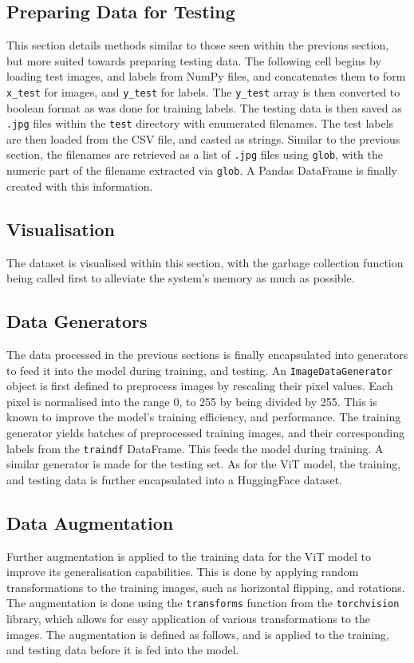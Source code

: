 \documentclass[../main]{subfiles}
\begin{document}
\subsection{Preparing Data for Testing}
This section details methods similar to those seen within the previous section,
but more suited towards preparing testing data. The following cell begins by
loading test images, and labels from NumPy files, and concatenates them to form
\texttt{x\_test} for images, and \texttt{y\_test} for labels. The
\texttt{y\_test} array is then converted to boolean format as was done for
training labels. The testing data is then saved as \texttt{.jpg} files within
the \texttt{test} directory with enumerated filenames. The test labels are then
loaded from the CSV file, and casted as strings. Similar to the previous
section, the filenames are retrieved as a list of \texttt{.jpg} files using
\texttt{glob}, with the numeric part of the filename extracted via
\texttt{glob}. A Pandas DataFrame is finally created with this information.

\subsection{Visualisation}
The dataset is visualised within this section, with the garbage
collection function being called first to alleviate the system's memory
as much as possible.
   
\subsection{Data Generators}
The data processed in the previous sections is finally encapsulated into
generators to feed it into the model during training, and testing. An
\texttt{ImageDataGenerator} object is first defined to preprocess images by
rescaling their pixel values. Each pixel is normalised into the range 0, to
255 by being divided by 255. This is known to improve the model's training
efficiency, and performance. The training generator yields batches of
preprocessed training images, and their corresponding labels from the
\texttt{traindf} DataFrame. This feeds the model during training. A similar
generator is made for the testing set. As for the ViT model, the training, and
testing data is further encapsulated into a HuggingFace dataset.

\subsection{Data Augmentation}
Further augmentation is applied to the training data for the ViT model to
improve its generalisation capabilities. This is done by applying random
transformations to the training images, such as horizontal flipping, and
rotations. The augmentation is done using the \texttt{transforms} function from
the \texttt{torchvision} library, which allows for easy application of various
transformations to the images. The augmentation is defined as follows, and is
applied to the training, and testing data before it is fed into the model.
\end{document}
